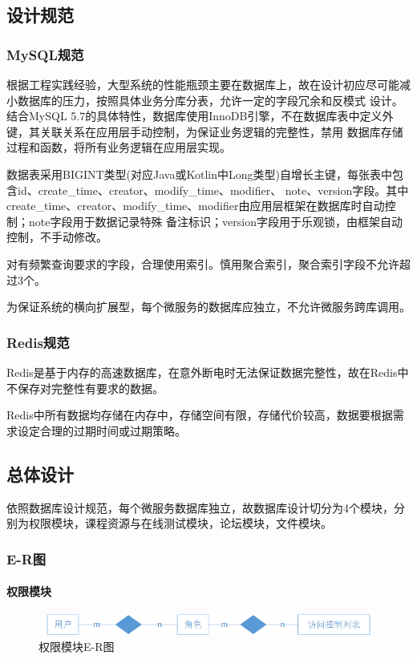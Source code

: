 \documentclass[titlepage,UTF8,linespread=1.5]{ctexart}
\begin{document}
\subsection{设计规范}
\subsubsection{MySQL规范}
根据工程实践经验，大型系统的性能瓶颈主要在数据库上，故在设计初应尽可能减小数据库的压力，按照具体业务分库分表，允许一定的字段冗余和反模式
设计。结合MySQL 5.7的具体特性，数据库使用InnoDB引擎，不在数据库表中定义外键，其关联关系在应用层手动控制，为保证业务逻辑的完整性，禁用
数据库存储过程和函数，将所有业务逻辑在应用层实现。\cite{alibaba-java-coding-guidelines}\par
数据表采用BIGINT类型(对应Java或Kotlin中Long类型)自增长主键，每张表中包含id、create\_time、creator、modify\_time、modifier、
note、version字段。其中create\_time、creator、modify\_time、modifier由应用层框架在数据库时自动控制；note字段用于数据记录特殊
备注标识；version字段用于乐观锁，由框架自动控制，不手动修改。\par
对有频繁查询要求的字段，合理使用索引。慎用聚合索引，聚合索引字段不允许超过3个。\par
为保证系统的横向扩展型，每个微服务的数据库应独立，不允许微服务跨库调用。\par
\subsubsection{Redis规范}
Redis是基于内存的高速数据库，在意外断电时无法保证数据完整性，故在Redis中不保存对完整性有要求的数据。\par
Redis中所有数据均存储在内存中，存储空间有限，存储代价较高，数据要根据需求设定合理的过期时间或过期策略。\par

\subsection{总体设计}
依照数据库设计规范，每个微服务数据库独立，故数据库设计切分为4个模块，分别为权限模块，课程资源与在线测试模块，论坛模块，文件模块。\par
\subsubsection{E-R图}
\paragraph{权限模块}
\begin{figure}[H]
    \centering
    \includegraphics[width=140mm]{er-auth.png}
    \caption{权限模块E-R图}
    \label{fig:er-auth}
\end{figure}
\end{document}
